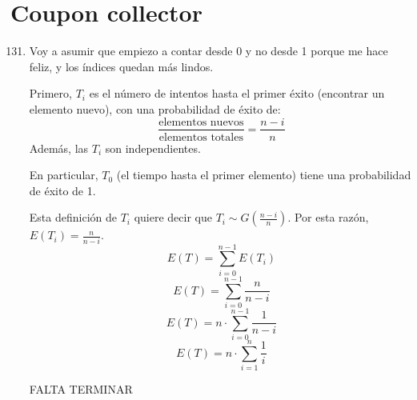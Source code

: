 \section{Coupon collector}
\begin{enumerate}
	\setcounter{enumi}{130}
	\item
		Voy a asumir que empiezo a contar desde 0 y no desde 1 porque me hace feliz, y los índices quedan más lindos.
	
		Primero, $T_i $ es el número de intentos hasta el primer éxito (encontrar un elemento nuevo), con una probabilidad de éxito de:
		$$\frac{\text{elementos nuevos}}{\text{elementos totales}} = \frac{n-i}{n}$$ Además, las $T_i$ son independientes.
		
		En particular, $T_0$ (el tiempo hasta el primer elemento) tiene una probabilidad de éxito de 1.
		
		Esta definición de $T_i$ quiere decir que $T_i \sim G(\frac{n-i}{n})$. Por esta razón, $E(T_i) = \frac{n}{n-i}$. 		
		$$E(T) = \sum_{i=0}^{n-1}E(T_i)$$
		$$E(T) = \sum_{i=0}^{n-1} \frac{n}{n-i}$$
		$$E(T) = n \cdot \sum_{i=0}^{n-1} \frac{1}{n-i}$$
		$$E(T) = n \cdot \sum_{i=1}^{n} \frac{1}{i}$$
		
		FALTA TERMINAR
\end{enumerate}

